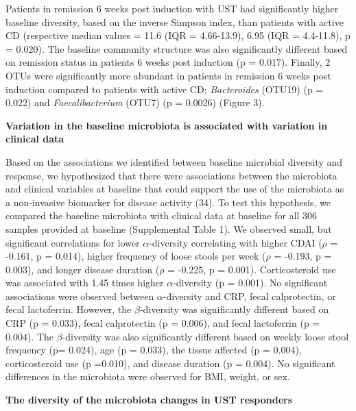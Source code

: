 \documentclass[12pt,]{article}
\begin{document}
Patients in remission 6 weeks post induction with UST had significantly
higher baseline diversity, based on the inverse Simpson index, than
patients with active CD (respective median values = 11.6 (IQR =
4.66-13.9), 6.95 (IQR = 4.4-11.8), p = 0.020). The baseline community
structure was also significantly different based on remission status in
patients 6 weeks post induction (p = 0.017). Finally, 2 OTUs were
significantly more abundant in patients in remission 6 weeks post
induction compared to patients with active CD; \emph{Bacteroides}
(OTU19) (p = 0.022) and \emph{Faecalibacterium} (OTU7) (p = 0.0026)
(Figure 3).

\textbf{Variation in the baseline microbiota is associated with
variation in clinical data}

Based on the associations we identified between baseline microbial
diversity and response, we hypothesized that there were associations
between the microbiota and clinical variables at baseline that could
support the use of the microbiota as a non-invasive biomarker for
disease activity (34). To test this hypothesis, we compared the baseline
microbiota with clinical data at baseline for all 306 samples provided
at baseline (Supplemental Table 1). We observed small, but significant
correlations for lower \({\alpha}\)-diversity correlating with higher
CDAI (\({\rho}\) = -0.161, p = 0.014), higher frequency of loose stools
per week (\({\rho}\) = -0.193, p = 0.003), and longer disease duration
(\({\rho}\) = -0.225, p = 0.001). Corticosteroid use was associated with
1.45 times higher \({\alpha}\)-diversity (p = 0.001). No significant
associations were observed between \({\alpha}\)-diversity and CRP, fecal
calprotectin, or fecal lactoferrin. However, the \({\beta}\)-diversity
was significantly different based on CRP (p = 0.033), fecal calprotectin
(p = 0.006), and fecal lactoferrin (p = 0.004). The
\({\beta}\)-diversity was also significantly different based on weekly
loose stool frequency (p= 0.024), age (p = 0.033), the tissue affected
(p = 0.004), corticosteroid use (p =0.010), and disease duration (p =
0.004). No significant differences in the microbiota were observed for
BMI, weight, or sex.

\textbf{The diversity of the microbiota changes in UST responders}
\end{document}
